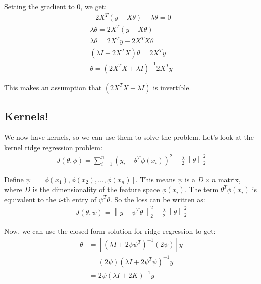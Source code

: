\documentclass[a4paper]{article}
\newcommand{\norm}[1]{\left\lVert#1\right\rVert}
\begin{document}
Setting the gradient to 0, we get:
\begin{align*}
    -2X^T (y - X\theta) + \lambda \theta = 0\\
    \lambda \theta = 2X^T (y - X\theta)\\
    \lambda \theta = 2X^T y - 2X^T X\theta\\
    (\lambda I + 2X^T X)\theta = 2X^T y\\
    \theta = (2X^T X + \lambda I)^{-1} 2X^T y
\end{align*}

This makes an assumption that $(2X^T X + \lambda I)$ is invertible.

\subsection{Kernels!}

We now have kernels, so we can use them to solve the problem. Let's look at the kernel ridge regression problem:
\begin{align*}
    J(\theta, \phi) = \sum_{i=1}^n (y_i - \theta^T \phi(x_i))^2 + \frac{\lambda}{2} \norm{\theta}_2^2
\end{align*}

Define $\psi = \left[ \phi(x_1), \phi(x_2), \ldots, \phi(x_n) \right]$. This means $\psi$ is a $D \times n$ matrix, where $D$ is the dimensionality of the feature space $\phi(x_i)$. The term $\theta^T \phi(x_i)$ is equivalent to the $i$-th entry of $\psi^T \theta$. So the loss can be written as:
\begin{align*}
    J(\theta, \psi) = \norm{y - \psi^T \theta}_2^2 + \frac{\lambda}{2} \norm{\theta}_2^2
\end{align*}

Now, we can use the closed form solution for ridge regression to get:
\begin{align*}
    \theta &= [( \lambda I + 2\psi\psi^T)^{-1} (2\psi) ] y \\
    &= (2\psi) (\lambda I + 2\psi^T\psi)^{-1} y \\
    &= 2\psi (\lambda I + 2K)^{-1} y
\end{align*}
\end{document}
